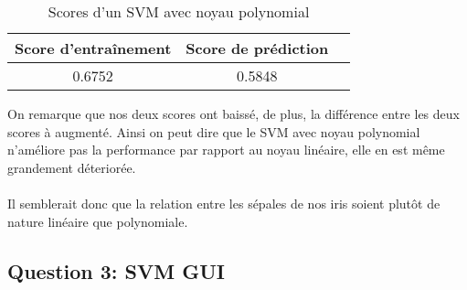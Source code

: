 \documentclass{article}
\begin{document}
\begin{table}[h]
    \centering
    \begin{tabular}{|c|c|c|}
       \hline  Score d'entraînement & Score de prédiction \\
       \hline  0.6752 & 0.5848\\
       \hline
    \end{tabular}
    \caption{Scores d'un SVM avec noyau polynomial}
    \label{tab:my_label}
\end{table}

On remarque que nos deux scores ont baissé, de plus, la différence entre les deux scores
à augmenté.
Ainsi on peut dire que le SVM avec noyau polynomial n'améliore pas la performance par rapport au noyau linéaire, elle en est même grandement déteriorée.
\\
\\
Il semblerait donc que la relation entre les sépales de nos iris soient plutôt de nature 
linéaire que polynomiale.

\newpage
\subsection{Question 3: SVM GUI}
\end{document}
